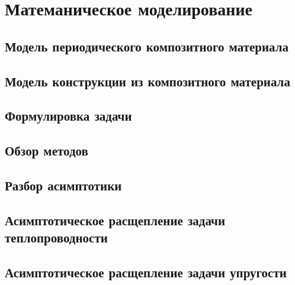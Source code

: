 \chapter{Матеманическое моделирование}\label{ch:ch1}

\section{Модель периодического композитного материала}\label{sec:ch1/sec1}



\section{Модель конструкции из композитного материала}\label{sec:ch1/sec1}



\section{Формулировка задачи}\label{sec:ch1/sec2}

\section{Обзор методов}\label{sec:ch1/sec3}

\section{Разбор асимптотики}\label{sec:ch1/sec4}

\section{Асимптотическое расщепление задачи теплопроводности}\label{sec:ch1/sec5}



\section{Асимптотическое расщепление задачи упругости}\label{sec:ch1/sec6}



\clearpage
